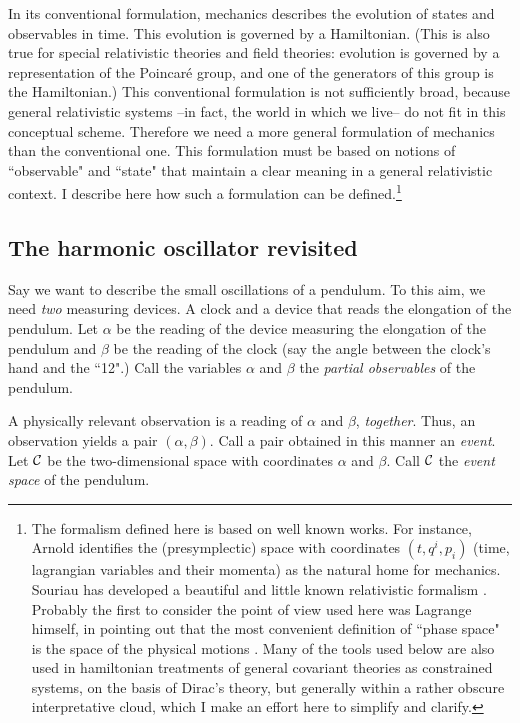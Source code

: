 \documentclass[10pt,nofootinbib]{revtex4}
\begin{document}
In its conventional formulation, mechanics describes
the evolution of states and observables in time.  This evolution is
governed by a Hamiltonian.  (This is also true for special relativistic
theories and field theories: evolution is governed by a representation of the Poincar\'e
group, and one of the generators of this group is the Hamiltonian.)  
This conventional formulation is
not sufficiently broad, because general relativistic systems --in
fact, the world in which we live-- do not fit in this conceptual
scheme.  Therefore we need a more general formulation of mechanics
than the conventional one.  This formulation must be based on notions
of ``observable" and ``state" that maintain a clear meaning in a
general relativistic context.  I describe here how such a formulation can be defined.\footnote{The
formalism defined here is based on well known works. 
For instance, Arnold 
\cite{Arnold} identifies the (presymplectic) space with coordinates
$(t,q^i,p_{i})$ (time, lagrangian variables and their momenta) as the
natural home for mechanics.  Souriau has developed a beautiful and
little known relativistic formalism  \cite{Souriau}. 
Probably the first to consider the point of view used here was
Lagrange  himself, in pointing out that the most
convenient definition of ``phase space" is the space of the physical
motions  \cite{Lagrange}.  Many of the
tools used below are also used in hamiltonian treatments of general
covariant theories as constrained systems, on the basis of Dirac's theory, 
but generally within a rather obscure interpretative cloud, which I make an
effort here to simplify and clarify.}

\subsection{The harmonic oscillator revisited}

Say we want to describe the small oscillations of a pendulum.  To this
aim, we need \emph{two} measuring devices.  A clock and a device that
reads the elongation of the pendulum.  Let $\alpha$ be  the reading of the device measuring
the elongation of the pendulum and  $\beta$ be the reading of the
clock (say the angle between the clock's hand and the ``12".) Call the variables
$\alpha$ and $\beta$  the \emph{partial observables}
of the pendulum.   

A physically relevant observation is a reading of $\alpha$ and 
$\beta$, \emph{together}.  Thus, an observation yields a pair
$(\alpha,\beta)$.  Call a pair obtained in this manner an {\em event}. 
Let $\cal C$ be the two-dimensional space with coordinates $\alpha$ and
$\beta$.  Call $\cal C$ the {\em event space} of
the pendulum. 
\end{document}
